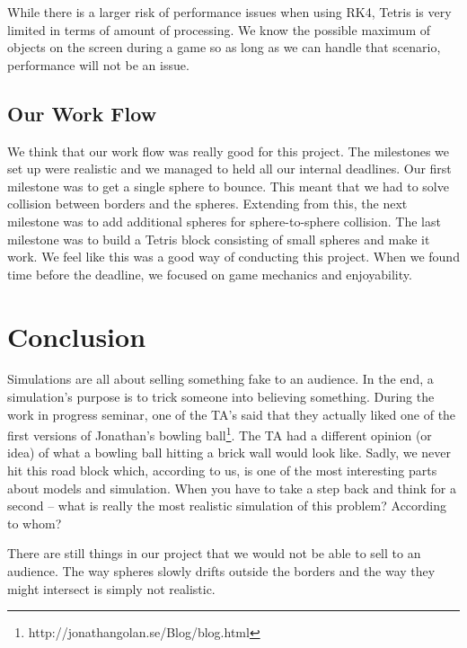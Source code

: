 \documentclass[11pt]{article} %
\begin{document}
While there is a larger risk of performance issues when using RK4, Tetris is very limited in terms of amount of processing. We know the possible maximum of objects on the screen during a game so as long as we can handle that scenario, performance will not be an issue.

\subsection{Our Work Flow}
We think that our work flow was really good for this project. The milestones we set up were realistic and we managed to held all our internal deadlines. Our first milestone was to get a single sphere to bounce. This meant that we had to solve collision between borders and the spheres. Extending from this, the next milestone was to add additional spheres for sphere-to-sphere collision. The last milestone was to build a Tetris block consisting of small spheres and make it work. We feel like this was a good way of conducting this project. When we found time before the deadline, we focused on game mechanics and enjoyability.

\section{Conclusion}
Simulations are all about selling something fake to an audience. In the end, a simulation's purpose is to trick someone into believing something. During the work in progress seminar, one of the TA's said that they actually liked one of the first versions of Jonathan's bowling ball\footnote{http://jonathangolan.se/Blog/blog.html}. The TA had a different opinion (or idea) of what a bowling ball hitting a brick wall would look like. Sadly, we never hit this road block which, according to us, is one of the most interesting parts about models and simulation. When you have to take a step back and think for a second -- what is really the most realistic simulation of this problem? According to whom?

There are still things in our project that we would not be able to sell to an audience. The way spheres slowly drifts outside the borders and the way they might intersect is simply not realistic. 
\end{document}
